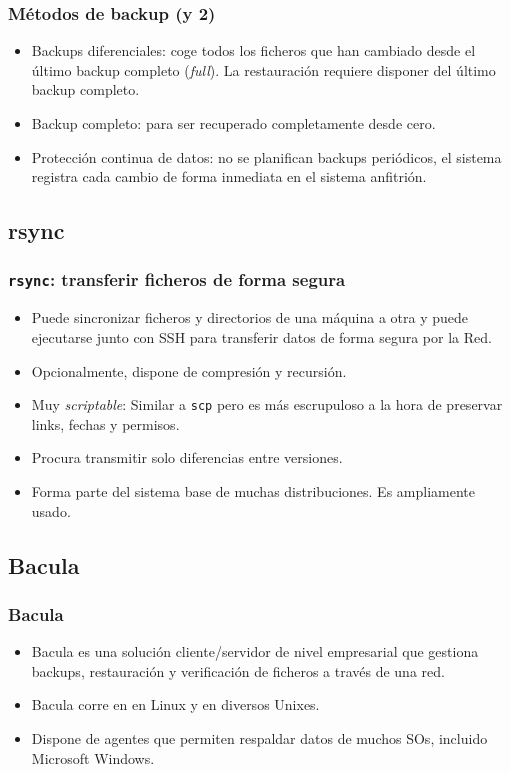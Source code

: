 \documentclass{beamer}
\begin{document}
\begin{frame}
  \frametitle{Métodos de backup (y 2)}
  \begin{itemize}
    \item \alert{Backups diferenciales:} coge todos los ficheros que han cambiado desde el último backup completo (\textit{full}). La restauración requiere disponer del último backup completo.
    \item \alert{Backup completo:} para ser recuperado completamente desde cero. 
    \item \alert{Protección continua de datos:} no se planifican backups periódicos, el sistema registra cada cambio de forma inmediata en el sistema anfitrión.
  \end{itemize}
\end{frame}



\subsection{rsync}
\begin{frame}
  \frametitle{\texttt{rsync}: transferir ficheros de forma segura}
  \begin{itemize}
    \item Puede sincronizar ficheros y directorios de una máquina a otra y puede ejecutarse junto con SSH para transferir datos de forma segura por la Red.
    \item Opcionalmente, dispone de compresión y recursión.
    \item Muy \textit{scriptable}: Similar a \texttt{scp} pero es más escrupuloso a la hora de preservar links, fechas y permisos.
    \item Procura transmitir solo diferencias entre versiones.
    \item Forma parte del sistema base de muchas distribuciones. Es ampliamente usado.
  \end{itemize}
\end{frame}


\subsection{Bacula}

\begin{frame}
  \frametitle{Bacula}
  \begin{itemize}
    \item Bacula es una solución cliente/servidor de nivel empresarial que gestiona backups, restauración y verificación de ficheros a través de una red.
    \item Bacula corre en en Linux y en diversos Unixes.
    \item Dispone de agentes que permiten respaldar datos de muchos SOs, incluido Microsoft Windows.
  \end{itemize}
\end{frame}
\end{document}
